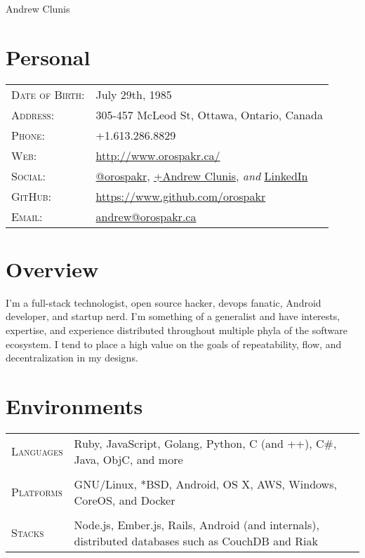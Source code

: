 \documentclass[letterpaper,10pt]{article}
\begin{document}
\pagestyle{empty} %

\par{\centering
{\Huge Andrew \textsc Clunis
}\bigskip\par}

\section{Personal}
\begin{longtable}{p{3cm}|p{12cm}}
  \textsc{Date of Birth:} & July 29th, 1985 \\
  \textsc{Address:} & 305-457 McLeod St, Ottawa, Ontario, Canada \\
  \textsc{Phone:} & +1.613.286.8829 \\
  \textsc{Web:} &  \href{http://www.orospakr.ca/}{http://www.orospakr.ca/} \\
  \textsc{Social:} & \href{http://twitter.com/orospakr}{@orospakr}, \href{https://plus.google.com/101728978406554574081}{+Andrew Clunis}, \emph{and} \href{http://www.linkedin.com/profile/view?id=16226844}{LinkedIn}\\
  \textsc{GitHub:} & \href{https://github.com/orospakr}{https://www.github.com/orospakr} \\
  \textsc{Email:} & \href{mailto:Andrew Clunis <andrew@orospakr.ca>}{andrew@orospakr.ca} \\
\end{longtable}

\section{Overview}
I'm a full-stack technologist, open source hacker, devops fanatic,
Android developer, and startup nerd.  I'm something of a generalist
and have interests, expertise, and experience distributed throughout
multiple phyla of the software ecosystem.  I tend to place a high
value on the goals of repeatability, flow, and decentralization in my
designs.

\section{Environments}
\begin{longtable}{p{3cm}|p{12cm}}
  \textsc{Languages} & Ruby, JavaScript, Golang, Python, C (and ++), C\#, Java, ObjC, and more \\
  \multicolumn{2}{c}{} \\
  \textsc{Platforms} & GNU/Linux, *BSD, Android, OS X, AWS, Windows, CoreOS, and Docker \\
  \multicolumn{2}{c}{} \\
  \textsc{Stacks} & Node.js, Ember.js, Rails, Android (and internals), distributed databases such as CouchDB and Riak \\
\end{longtable}
\end{document}
